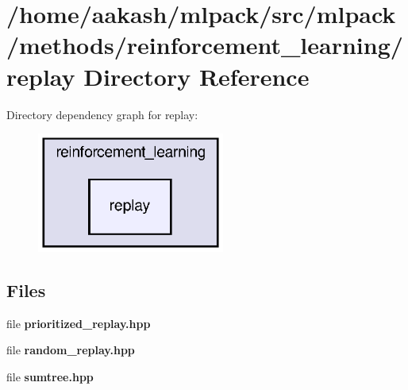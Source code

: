 \section{/home/aakash/mlpack/src/mlpack/methods/reinforcement\+\_\+learning/replay Directory Reference}
\label{dir_2922d4f11c40e153861f18819539f1ce}
Directory dependency graph for replay\+:
\nopagebreak
\begin{figure}[H]
\begin{center}
\leavevmode
\includegraphics[width=175pt]{dir_2922d4f11c40e153861f18819539f1ce_dep}
\end{center}
\end{figure}
\subsection*{Files}
\begin{DoxyCompactItemize}
\item 
file \textbf{ prioritized\+\_\+replay.\+hpp}
\item 
file \textbf{ random\+\_\+replay.\+hpp}
\item 
file \textbf{ sumtree.\+hpp}
\end{DoxyCompactItemize}
